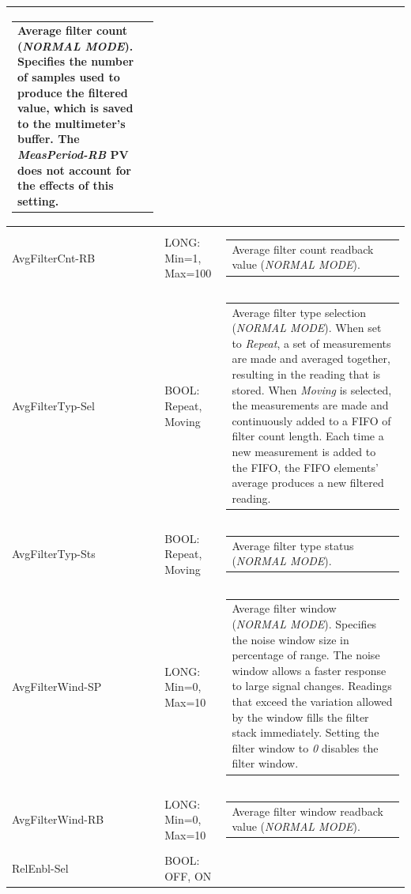 \documentclass[openany]{article}
\begin{document}
\begin{longtable}{| m{3.0cm} m{4.5cm} m{7.0cm} |}
\begin{tabular}{@{}m{6cm}@{}}
	    					Average filter count (\emph{NORMAL MODE}). Specifies the number of samples used to produce the filtered value, which is saved to the multimeter's buffer. The \emph{MeasPeriod-RB} PV does not account for the effects of this setting.
						\end{tabular} \\ \hline
		AvgFilterCnt-RB & LONG: Min=1, Max=100 & \begin{tabular}{@{}m{6cm}@{}}
	    					Average filter count readback value (\emph{NORMAL MODE}).
						\end{tabular} \\ \hline
		AvgFilterTyp-Sel & BOOL: Repeat, Moving & \begin{tabular}{@{}m{6cm}@{}}
	    					Average filter type selection (\emph{NORMAL MODE}). When set to \emph{Repeat}, a set of measurements are made and averaged together, resulting in the reading that is stored. When \emph{Moving} is selected, the measurements are made and continuously added to a FIFO of filter count length. Each time a new measurement is added to the FIFO, the FIFO elements' average produces a new filtered reading.
						\end{tabular} \\ \hline
		AvgFilterTyp-Sts & BOOL: Repeat, Moving & \begin{tabular}{@{}m{6cm}@{}}
	    					Average filter type status (\emph{NORMAL MODE}).
						\end{tabular} \\ \hline
		AvgFilterWind-SP & LONG: Min=0, Max=10 & \begin{tabular}{@{}m{6cm}@{}}
	    					Average filter window (\emph{NORMAL MODE}). Specifies the noise window size in percentage of range. The noise window allows a faster response to large signal changes. Readings that exceed the variation allowed by the window fills the filter stack immediately. Setting the filter window to \emph{0} disables the filter window.
						\end{tabular} \\ \hline
		AvgFilterWind-RB & LONG: Min=0, Max=10 & \begin{tabular}{@{}m{6cm}@{}}
	    					Average filter window readback value (\emph{NORMAL MODE}).
						\end{tabular} \\ \hline
		RelEnbl-Sel & BOOL: OFF, ON & \begin{tabular}{@{}m{6cm}@{}}

\end{tabular}
\end{longtable}
\end{document}
